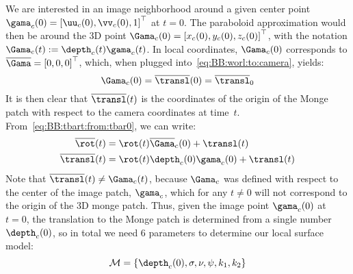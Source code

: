 We are interested in an image neighborhood around a given center point
$\gama_c(0) = \left[ \uu_c(0), \vv_c(0), 1 \right]^\top$ at $t=0$. The paraboloid approximation would
then be around the 3D point $\Gama_c(0) = \left[ x_c(0), y_c(0), z_c(0) \right]^\top$,
with the notation $\Gama_c(t) := \depth_c(t)\gama_c(t)$. In local coordinates, $\Gama_c(0)$ corresponds to 
$\overline \Gama = \left[ 0, 0, 0 \right]^\top$, which, when plugged
into~\eqref{eq:BB:worl:to:camera}, yields:
\begin{equation}
\Gama_c(0) = \overline \transl(0) = \overline\transl_0
\end{equation}
It is then clear that $\overline \transl(t)$ is the coordinates of the origin of the Monge
patch with respect to the camera coordinates at time~$t$.
From~\eqref{eq:BB:tbart:from:tbar0}, we can write:
\begin{align}
\overline{\rot}(t)&=\rot(t)\overline \Gama_c(0) + \transl(t)\\
\overline{\transl}(t)&=\rot(t)\depth_c(0)\gama_c(0) + \transl(t)
\end{align}
Note that $\overline \transl(t) \neq \Gama_c(t)$, because $\Gama_c$ was defined with
respect to the center of the image patch, $\gama_c$, which for any $t \neq 0$
will not correspond to the origin of the 3D monge patch.
Thus, given the image point $\gama_c(0)$ at $t=0$, the translation to the Monge patch is
determined from a single number $\depth_c(0)$, so in total we need 6 parameters to
determine our local surface model: 
\begin{equation}
\mathcal M = \left\{ \depth_c(0), \sigma,\nu,\psi, k_1, k_2 \right\}
\end{equation}
